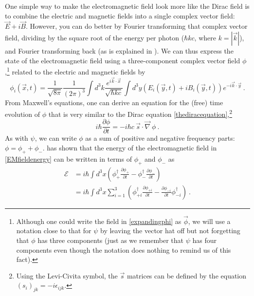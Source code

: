 \documentclass[12pt,secnumarabic,amsmath,amssymb,balancelastpage,nofootinbib]{article}
\begin{document}
One simple way to make the electromagnetic field look more like the Dirac field is to combine the electric and magnetic fields into a single complex vector field: $\vec{E}+i\vec{B}$.  However, you can do better by Fourier transforming that complex vector field, dividing by the square root of the energy per photon ($\hbar k c$, where $k=|\vec{k}|$), and Fourier transforming back (as is explained in \citealp{good1957, emasqp}).  We can thus express the state of the electromagnetic field using a three-component complex vector field $\phi$,\footnote{Although one could write the field in \eqref{expandingphi} as $\vec{\phi}$, we will use a notation close to that for $\psi$ by leaving the vector hat off but not forgetting that $\phi$ has three components (just as we remember that $\psi$ has four components even though the notation does nothing to remind us of this fact).} related to the electric and magnetic fields by
\begin{equation}
\phi_i(\vec{x},t)=\frac{1}{\sqrt{8\pi}}\frac{1}{(2\pi)^3}\int{ d^3 k  \frac{e^{i \vec{k}\cdot\vec{x}}}{\sqrt{\hbar k c}} \int{d^3 y\left(E_i(\vec{y},t)+iB_i(\vec{y},t)\right)e^{-i \vec{k}\cdot\vec{y}}} }
\label{expandingphi}
\ .
\end{equation}
From Maxwell's equations, one can derive an equation for the (free) time evolution of $\phi$ that is very similar to the Dirac equation \eqref{thediracequation},\footnote{Using the Levi-Civita symbol, the $\vec{s}$ matrices can be defined by the equation $(s_i)_{jk}=-i \epsilon_{ijk}$.}
\begin{equation}
i\hbar\frac{\partial \phi}{\partial t}  = -i \hbar c \: \vec{s}\cdot \vec{\nabla}\: \phi
\ .
\end{equation}
As with $\psi$, we can write $\phi$ as a sum of positive and negative frequency parts: $\phi=\phi_++\phi_-$.  \citet[eq.\ 31]{good1957} has shown that the energy of the electromagnetic field in \eqref{EMfieldenergy} can be written in terms of $\phi_+$ and $\phi_-$ as
\begin{align}
\mathcal{E}&=i \hbar \int{d^3 x \left(\phi^{\dagger}_+ \frac{\partial\phi_+}{\partial t} - \phi^{\dagger}_- \frac{\partial \phi_-}{\partial t} \right)}
\nonumber
\\
&=i \hbar \int{d^3 x \sum_{i=1}^3\left(\phi^{\dagger}_{+i} \frac{\partial\phi_{+i}}{\partial t} -  \frac{\partial \phi_{-i}}{\partial t} \phi^{\dagger}_{-i}\right)}
\ .
\label{phienergy}
\end{align}
\end{document}
